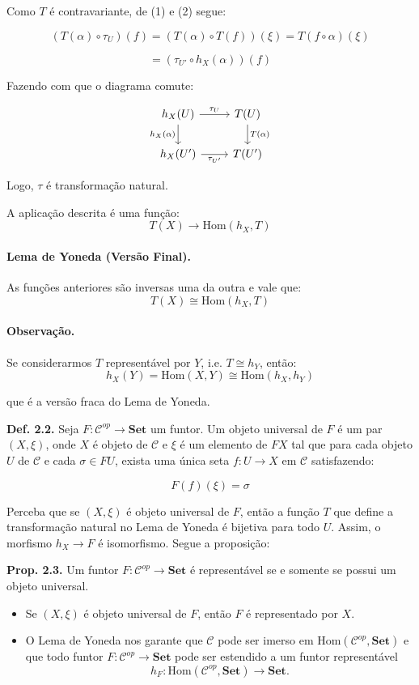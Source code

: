 \documentclass{article}
\theoremstyle{plain}                    %
\theoremstyle{definition}
\theoremstyle{remark}
\begin{document}
Como $T$ é contravariante, de (1) e (2) segue:

\[
(T(\alpha) \circ \tau_U)(f) = (T(\alpha) \circ T(f))(\xi) = T(f \circ \alpha)(\xi)
\]

\[
= (\tau_{U'} \circ h_X(\alpha))(f)
\]

Fazendo com que o diagrama comute:

\[
\begin{tikzcd}
h_X(U) \arrow[r, "\tau_U"] \arrow[d, "h_X(\alpha)"'] & T(U) \arrow[d, "T(\alpha)"] \\
h_X(U') \arrow[r, "\tau_{U'}"'] & T(U')
\end{tikzcd}
\]

Logo, $\tau$ é transformação natural.

A aplicação descrita é uma função:
\[
T(X) \to \text{Hom}(h_X, T)
\]

\paragraph{Lema de Yoneda (Versão Final).}
As funções anteriores são inversas uma da outra e vale que:
\[
T(X) \cong \text{Hom}(h_X, T)
\]

\paragraph{Observação.}
Se considerarmos $T$ representável por $Y$, i.e. $T \cong h_Y$, então:
\[
h_X(Y) = \text{Hom}(X, Y) \cong \text{Hom}(h_X, h_Y)
\]

que é a versão fraca do Lema de Yoneda.


\textbf{Def. 2.2.} Seja $ F : \mathcal{C}^{op} \to \mathbf{Set} $ um funtor.  
Um objeto universal de $F$ é um par $(X, \xi)$, onde $X$ é objeto de $\mathcal{C}$ e $\xi$ é um elemento de $FX$ tal que para cada objeto $U$ de $\mathcal{C}$ e cada $\sigma \in FU$, exista uma única seta $f : U \to X$ em $\mathcal{C}$ satisfazendo:

$$
F(f)(\xi) = \sigma
$$

Perceba que se $(X, \xi)$ é objeto universal de $F$, então a função $T$ que define a transformação natural no Lema de Yoneda é bijetiva para todo $U$.  
Assim, o morfismo $h_X \to F$ é isomorfismo.  
Segue a proposição:

\medskip

\textbf{Prop. 2.3.} Um funtor $F : \mathcal{C}^{op} \to \mathbf{Set}$ é representável se e somente se possui um objeto universal.

\begin{itemize}
    \item Se $(X, \xi)$ é objeto universal de $F$, então $F$ é representado por $X$.
    
    \item O Lema de Yoneda nos garante que $\mathcal{C}$ pode ser imerso em $\text{Hom}(\mathcal{C}^{op}, \mathbf{Set})$ e que todo funtor $F : \mathcal{C}^{op} \to \mathbf{Set}$ pode ser estendido a um funtor representável 
    $$
    h_F : \text{Hom}(\mathcal{C}^{op}, \mathbf{Set}) \to \mathbf{Set}.
    $$
\end{itemize}
\end{document}
